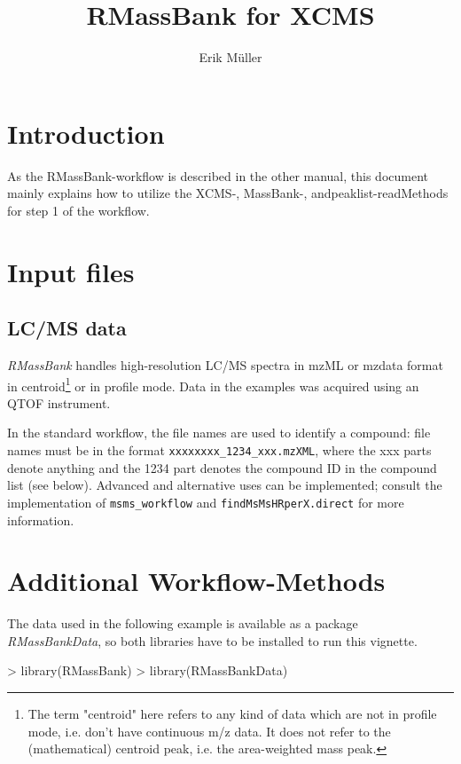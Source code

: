 \documentclass[letterpaper, 11pt]{article}
\newcommand{\Rpackage}[1]{{\textit{#1}}}
\newcommand{\funcarg}[1]{{\texttt{#1}}}
\newcommand{\Rvar}[1]{{\texttt{#1}}}
\begin{document}
\title{RMassBank for XCMS}
\author{Erik M\"uller}
\maketitle
\tableofcontents
\newpage

\section{Introduction}

As the RMassBank-workflow is described in the other manual, this document mainly explains how to utilize the
XCMS-, MassBank-, andpeaklist-readMethods for step 1 of the workflow.

\section{Input files}

\subsection{LC/MS data}

\Rpackage{RMassBank} handles high-resolution LC/MS spectra in mzML or mzdata format in
centroid\footnote{The term "centroid" here refers to any kind of data which are
not in profile mode, i.e. don't have continuous m/z data. It does not refer to
the (mathematical) centroid peak, i.e. the area-weighted mass peak.} or in
profile mode.
Data in the examples was acquired using an QTOF instrument.

In the standard workflow, the file names are used to identify a
compound: file names must be in the format \funcarg{xxxxxxxx\_1234\_xxx.mzXML},
where the xxx parts denote anything and the 1234 part denotes the compound ID in
the compound list (see below). Advanced and alternative uses can be implemented;
consult the implementation of \Rvar{msms\_workflow}  and \Rvar{findMsMsHRperX.direct} for
more information.

\section{Additional Workflow-Methods}

The data used in the following example is available as a package \Rpackage{RMassBankData},
so both libraries have to be installed to run this vignette.

\begin{Schunk}
\begin{Sinput}
> library(RMassBank)
> library(RMassBankData)
\end{Sinput}
\end{Schunk}
\end{document}
